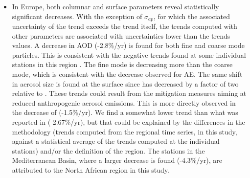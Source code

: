 \documentclass[acp, manuscript]{copernicus}
\begin{document}
\begin{itemize}
 \item In Europe, both columnar and surface parameters reveal statistically significant decreases. With the exception of $\sigma_{ap}$, for which the associated uncertainty of the trend exceeds the trend itself, the trends computed with other parameters  are associated with uncertainties lower than the trends values. A decrease in AOD (-2.8\%/yr) is found for both fine and coarse mode particles. This is consistent with the negative trends found at some individual stations in this region \citep{glantz2019}. The fine mode is decreasing more than the coarse mode, which is consistent with the decrease observed for AE. The same shift in aerosol size is found at the surface since  has decreased by a factor of two relative to . These trends could result from the mitigation measures aiming at reduced anthropogenic aerosol emissions. This is more directly observed in the decrease of  (-1.5\%/yr). We find a somewhat lower trend than what was reported in \cite{aas2019global} (-2.67\%/yr), but that could be explained by the differences in the methodology (trends computed from the regional time series, in this study, against a statistical average of the trends computed at the individual stations) and/or the definition of the region. The stations in the Mediterranean Basin, where a larger decrease is found (-4.3\%/yr), are attributed to the North African region in this study.
 

\end{itemize}
\end{document}
